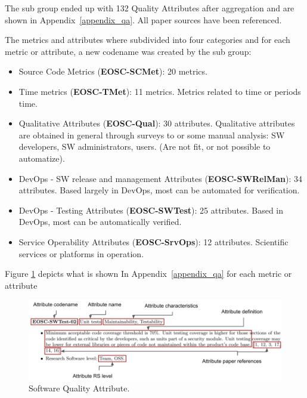 The sub group ended up with 132 Quality Attributes after aggregation and are shown in Appendix~\ref{appendix_qa}. All paper sources have been referenced.

The metrics and attributes where subdivided into four categories and for each metric or attribute,
a new codename was created by the sub group:

\begin{itemize}
    \item Source Code Metrics (\textbf{EOSC-SCMet}): 20 metrics.
    \item Time metrics (\textbf{EOSC-TMet}): 11 metrics. Metrics related to time or periods time.
    \item Qualitative Attributes (\textbf{EOSC-Qual}): 30 attributes. Qualitative attributes are obtained in general through surveys to or some manual analysis: SW developers, SW administrators, users. (Are not fit, or not possible to automatize).
    \item DevOps - SW release and management Attributes (\textbf{EOSC-SWRelMan}): 34 attributes. Based largely in DevOps, most can be automated for verification.
    \item DevOps - Testing Attributes (\textbf{EOSC-SWTest}): 25 attributes. Based in DevOps, most can be automatically verified.
    \item Service Operability Attributes (\textbf{EOSC-SrvOps}): 12 attributes. Scientific services or platforms in operation.
\end{itemize}

Figure \ref{fig:sqattr} depicts what is shown In Appendix~\ref{appendix_qa} for each metric or attribute

\begin{figure}[h]
    \centering
    \includegraphics[width=0.99\linewidth]{imgs/qa.png}
    \caption{Software Quality Attribute.}
    \label{fig:sqattr}
\end{figure}
